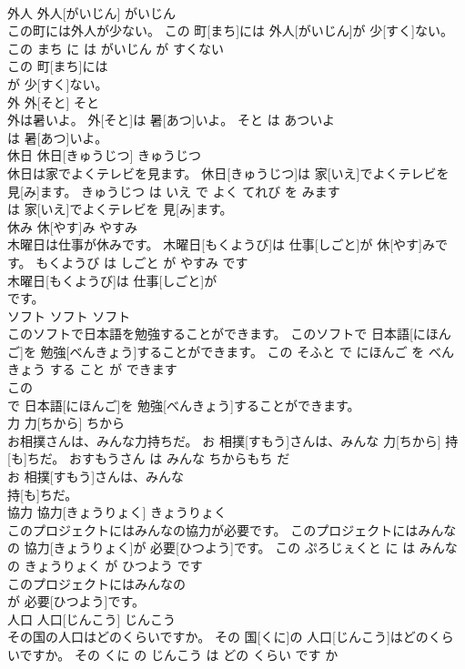 \documentclass[8pt]{extreport}
\begin{document}
\begin{CJK}{UTF8}{min}
\\	外人	外人[がいじん]	がいじん	
\\	この町には外人が少ない。	この 町[まち]には 外人[がいじん]が 少[すく]ない。	この まち に は がいじん が すくない	
\\	この 町[まち]には
\\	が 少[すく]ない。			
\\	外	外[そと]	そと	
\\	外は暑いよ。	外[そと]は 暑[あつ]いよ。	そと は あついよ	
\\	は 暑[あつ]いよ。			
\\	休日	休日[きゅうじつ]	きゅうじつ	
\\	休日は家でよくテレビを見ます。	休日[きゅうじつ]は 家[いえ]でよくテレビを 見[み]ます。	きゅうじつ は いえ で よく てれび を みます	
\\	は 家[いえ]でよくテレビを 見[み]ます。			
\\	休み	休[やす]み	やすみ	
\\	木曜日は仕事が休みです。	木曜日[もくようび]は 仕事[しごと]が 休[やす]みです。	もくようび は しごと が やすみ です	
\\	木曜日[もくようび]は 仕事[しごと]が
\\	です。			
\\	ソフト	ソフト	ソフト	
\\	このソフトで日本語を勉強することができます。	このソフトで 日本語[にほんご]を 勉強[べんきょう]することができます。	この そふと で にほんご を べんきょう する こと が できます	
\\	この
\\	で 日本語[にほんご]を 勉強[べんきょう]することができます。			
\\	力	力[ちから]	ちから	
\\	お相撲さんは、みんな力持ちだ。	お 相撲[すもう]さんは、みんな 力[ちから] 持[も]ちだ。	おすもうさん は みんな ちからもち だ	
\\	お 相撲[すもう]さんは、みんな
\\	持[も]ちだ。			
\\	協力	協力[きょうりょく]	きょうりょく	
\\	このプロジェクトにはみんなの協力が必要です。	このプロジェクトにはみんなの 協力[きょうりょく]が 必要[ひつよう]です。	この ぷろじぇくと に は みんな の きょうりょく が ひつよう です	
\\	このプロジェクトにはみんなの
\\	が 必要[ひつよう]です。			
\\	人口	人口[じんこう]	じんこう	
\\	その国の人口はどのくらいですか。	その 国[くに]の 人口[じんこう]はどのくらいですか。	その くに の じんこう は どの くらい です か	

\end{CJK}
\end{document}
